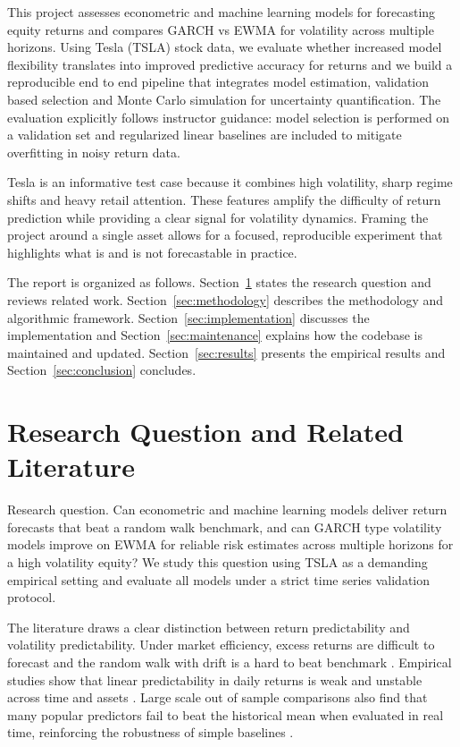 \documentclass[11pt,a4paper]{article}
\begin{document}
\noindent This project assesses econometric and machine learning models for forecasting equity returns and compares GARCH vs EWMA for volatility across multiple horizons. Using Tesla (TSLA) stock data, we evaluate whether increased model flexibility translates into improved predictive accuracy for returns and we build a reproducible end to end pipeline that integrates model estimation, validation based selection and Monte Carlo simulation for uncertainty quantification. The evaluation explicitly follows instructor guidance: model selection is performed on a validation set and regularized linear baselines are included to mitigate overfitting in noisy return data.

\noindent Tesla is an informative test case because it combines high volatility, sharp regime shifts and heavy retail attention. These features amplify the difficulty of return prediction while providing a clear signal for volatility dynamics. Framing the project around a single asset allows for a focused, reproducible experiment that highlights what is and is not forecastable in practice.

\noindent The report is organized as follows. Section~\ref{sec:research-question} states the research question and reviews related work. Section~\ref{sec:methodology} describes the methodology and algorithmic framework. Section~\ref{sec:implementation} discusses the implementation and Section~\ref{sec:maintenance} explains how the codebase is maintained and updated. Section~\ref{sec:results} presents the empirical results and Section~\ref{sec:conclusion} concludes.
\endgroup

\section{Research Question and Related Literature}
\label{sec:research-question}
\begingroup
\setlength{\parskip}{0.35\baselineskip}
\setlength{\parindent}{1.25em}

\hspace*{\parindent}Research question. Can econometric and machine learning models deliver return forecasts that beat a random walk benchmark, and can GARCH type volatility models improve on EWMA for reliable risk estimates across multiple horizons for a high volatility equity? We study this question using TSLA as a demanding empirical setting and evaluate all models under a strict time series validation protocol.

\noindent The literature draws a clear distinction between return predictability and volatility predictability. Under market efficiency, excess returns are difficult to forecast and the random walk with drift is a hard to beat benchmark \parencite{Fama1970}. Empirical studies show that linear predictability in daily returns is weak and unstable across time and assets \parencite{Campbell1997,Hansen2005}. Large scale out of sample comparisons also find that many popular predictors fail to beat the historical mean when evaluated in real time, reinforcing the robustness of simple baselines \parencite{Welch2008}.
\end{document}
